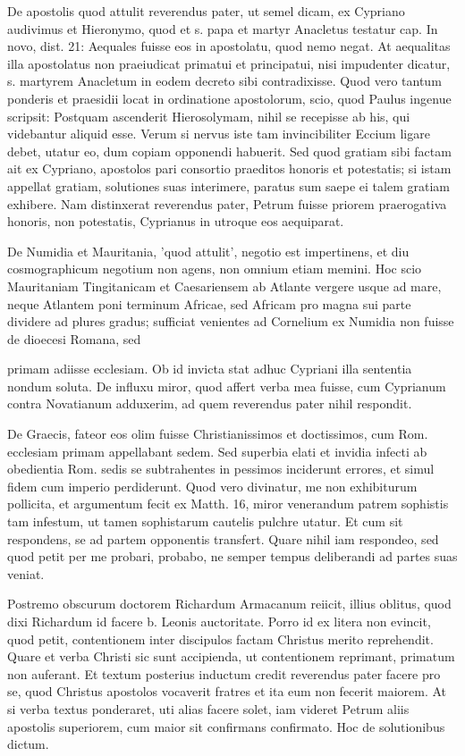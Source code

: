 De apostolis quod attulit reverendus pater, ut semel dicam, ex Cypriano audivimus et Hieronymo, quod et s. papa et martyr Anacletus testatur cap. In novo, dist. 21: Aequales fuisse eos in apostolatu, quod nemo negat. At aequalitas illa apostolatus non praeiudicat primatui et principatui, nisi impudenter dicatur, s. martyrem Anacletum in eodem decreto sibi contradixisse. Quod vero tantum ponderis et praesidii locat in ordinatione apostolorum, scio, quod Paulus ingenue scripsit: Postquam ascenderit Hierosolymam, nihil se recepisse ab his, qui videbantur aliquid esse. Verum si nervus iste tam invincibiliter Eccium ligare debet, utatur eo, dum copiam opponendi habuerit. Sed quod gratiam sibi factam ait ex Cypriano, apostolos pari consortio praeditos honoris et potestatis; si istam appellat gratiam, solutiones suas interimere, paratus sum saepe ei talem gratiam exhibere. Nam distinxerat reverendus pater, Petrum fuisse priorem praerogativa honoris, non potestatis, Cyprianus in utroque eos aequiparat.

De Numidia et Mauritania, 'quod attulit', negotio est impertinens, et diu cosmographicum negotium non agens, non omnium etiam memini. Hoc scio Mauritaniam Tingitanicam et Caesariensem ab Atlante vergere usque ad mare, neque Atlantem poni terminum Africae, sed Africam pro magna sui parte dividere ad plures gradus; sufficiat venientes ad Cornelium ex Numidia non fuisse de dioecesi Romana, sed

primam adiisse ecclesiam. Ob id invicta stat adhuc Cypriani illa sententia nondum soluta. De influxu miror, quod affert verba mea fuisse, cum Cyprianum contra Novatianum adduxerim, ad quem reverendus pater nihil respondit.

De Graecis, fateor eos olim fuisse Christianissimos et doctissimos, cum Rom. ecclesiam primam appellabant sedem. Sed superbia elati et invidia infecti ab obedientia Rom. sedis se subtrahentes in pessimos inciderunt errores, et simul fidem cum imperio perdiderunt. Quod vero divinatur, me non exhibiturum pollicita, et argumentum fecit ex Matth. 16, miror venerandum patrem sophistis tam infestum, ut tamen sophistarum cautelis pulchre utatur. Et cum sit respondens, se ad partem opponentis transfert. Quare nihil iam respondeo, sed quod petit per me probari, probabo, ne semper tempus deliberandi ad partes suas veniat.

Postremo obscurum doctorem Richardum Armacanum reiicit, illius oblitus, quod dixi Richardum id facere b. Leonis auctoritate. Porro id ex litera non evincit, quod petit, contentionem inter discipulos factam Christus merito reprehendit. Quare et verba Christi sic sunt accipienda, ut contentionem reprimant, primatum non auferant. Et textum posterius inductum credit \marginpar{\small[274]} reverendus pater facere pro se, quod Christus apostolos vocaverit fratres et ita eum non fecerit maiorem. At si verba textus ponderaret, uti alias facere solet, iam videret Petrum aliis apostolis superiorem, cum maior sit confirmans confirmato. Hoc de solutionibus dictum.


